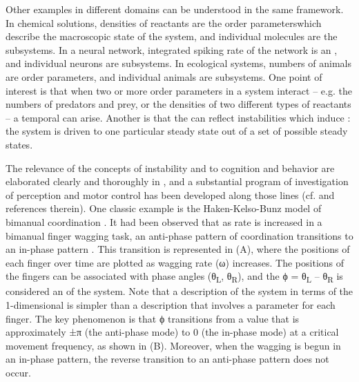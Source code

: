   Other examples in different domains can be understood in the same framework. In chemical solutions, densities of reactants are the order parameters\linebreak which describe the macroscopic state of the system, and individual molecules are the subsystems. In a neural network, integrated spiking rate of the network is an , and individual neurons are subsystems. In ecological systems, numbers of animals are order parameters, and individual animals are subsystems. One point of interest is that when two or more order parameters in a system interact -- e.g. the numbers of predators and prey, or the densities of two different types of reactants -- a temporal  can arise. Another is that the  can reflect instabilities which induce : the system is driven to one particular steady state out of a set of possible steady states. 

The relevance of the concepts of instability and  to cognition and behavior are elaborated clearly and thoroughly in \citet{Kelso1997}, and a substantial program of investigation of perception and motor control has been developed along those lines (cf. \citet{Kelso1997} and references therein). One classic example is the Haken-Kelso-Bunz model of bimanual coordination \citep{HakenEtAl1985,SchonerKelso1988}. It had been observed that as rate is increased in a bimanual finger wagging task, an anti-phase pattern of coordination transitions to an in-phase pattern \citep{KelsoEtAl1981}. This transition is represented in {}(A), where the positions of each finger over time are plotted as wagging rate (ω) increases. The positions of the fingers can be associated with phase angles (θ\textsubscript{L}, θ\textsubscript{R}), and the  ϕ = θ\textsubscript{L} – θ\textsubscript{R} is considered an  of the system. Note that a description of the system in terms of the 1-di\-men\-sional  is simpler than a description that involves a  parameter for each finger. The key phenomenon is that ϕ transitions from a value that is approximately ±π (the anti-phase mode) to 0 (the in-phase mode) at a critical movement frequency, as shown in {}(B). Moreover, when the wagging is begun in an in-phase pattern, the reverse transition to an anti-phase pattern does not occur.

